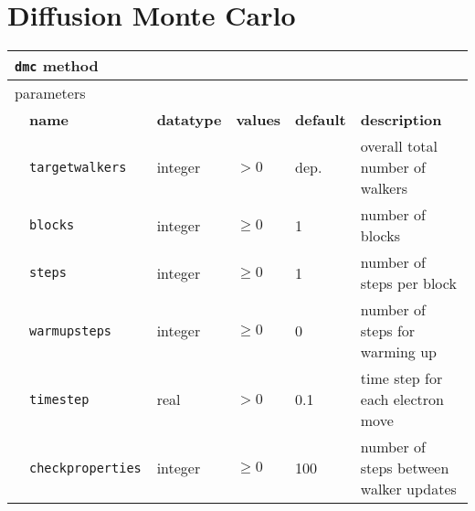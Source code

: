 \section{Diffusion Monte Carlo}
\label{sec:dmc}
\pagebreak
\begin{table}[h]
\begin{center}
\begin{tabularx}{\textwidth}{l l l l l X }
\hline
\multicolumn{6}{l}{\texttt{dmc} method} \\
\hline
\multicolumn{2}{l}{parameters}  & \multicolumn{4}{l}{}\\
   &   \bfseries name     & \bfseries datatype & \bfseries values & \bfseries default   & \bfseries description \\
   &   \texttt{targetwalkers             } &  integer  & $> 0$ & dep.   & overall total number of walkers \\
   &   \texttt{blocks              } &  integer  & $\ge 0$ & 1   & number of blocks            \\
   &   \texttt{steps               } &  integer  & $\ge 0$ & 1   & number of steps per block   \\
   &   \texttt{warmupsteps         } &  integer  & $\ge 0$ & 0   & number of steps for warming up\\
   &   \texttt{timestep            } &  real     & $> 0$ & 0.1 & time step for each electron move \\
   &   \texttt{checkproperties     } &  integer  & $\ge 0$ & 100   & number of steps between walker updates  \\

\end{tabularx}
\end{center}
\end{table}
